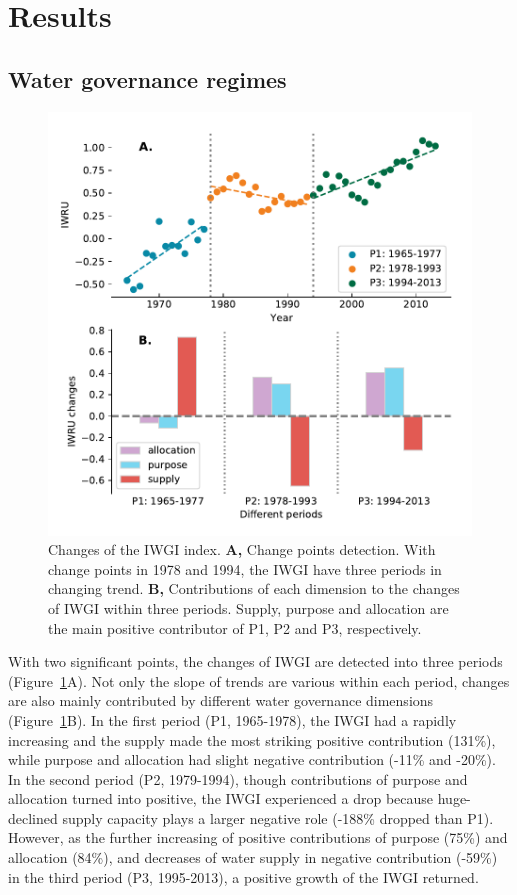 \documentclass[9pt, twocolumn, twoside, lineno]{pnas-new}
\begin{document}
\section*{Results}
\subsection*{Water governance regimes}

\begin{figure}[ht!]
	\centering
	\includegraphics[width=\linewidth]{../../figures/main/index.pdf}
	\caption{Changes of the IWGI index. 
	\textbf{A,} Change points detection. With change points in 1978 and 1994, the IWGI have three periods in changing trend.
	\textbf{B,} Contributions of each dimension to the changes of IWGI within three periods. Supply, purpose and allocation are the main positive contributor of P1, P2 and P3, respectively.
	}
	\label{fig:IWGI}
\end{figure}

With two significant points, the changes of IWGI are detected into three periods (Figure~\ref{fig:IWGI}A). 
Not only the slope of trends are various within each period, changes are also mainly contributed by different water governance dimensions (Figure~\ref{fig:IWGI}B).
In the first period (P1, 1965-1978), the IWGI had a rapidly increasing and the supply made the most striking positive contribution (131\%), while purpose and allocation had slight negative contribution (-11\% and -20\%).
In the second period (P2, 1979-1994), though contributions of purpose and allocation turned into positive, the IWGI experienced a drop because huge-declined supply capacity plays a larger negative role (-188\% dropped than P1). 
However, as the further increasing of positive contributions of purpose (75\%) and allocation (84\%), and decreases of water supply in negative contribution (-59\%) in the third period (P3, 1995-2013), a positive growth of the IWGI returned.
\end{document}
